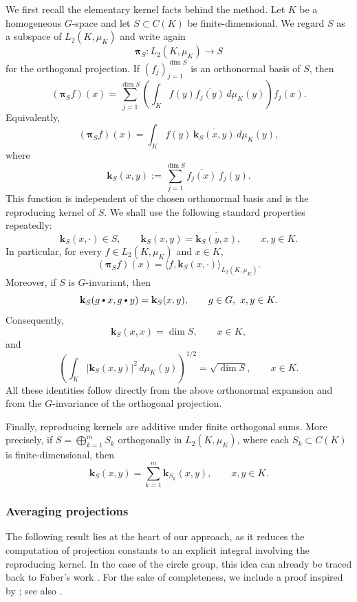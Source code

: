 \documentclass[11pt,showkeys]{amsart}
\newcommand{\hbullet}{\mathbin{\vcenter{\hbox{\scalebox{0.7}{$\bullet$}}}}}
\begin{document}
We first recall the elementary kernel facts behind the method. Let \(K\)
be a homogeneous \(G\)-space and let \(S\subset C(K)\) be
finite-dimensional. We regard \(S\) as a subspace of \(L_2(K,\mu_K)\) and
write again
\[
        \mathbf \pi_S:L_2(K,\mu_K)\longrightarrow S
\]
for the orthogonal projection. If
\((f_j)_{j=1}^{\dim S}\) is an orthonormal basis of \(S\), then
\[
        (\mathbf \pi_S f)(x)
        =
        \sum_{j=1}^{\dim S}
        \left(
        \int_K f(y)\overline{f_j(y)}\,d\mu_K(y)
        \right)f_j(x).
\]
Equivalently,
\[
        (\mathbf \pi_S f)(x)
        =
        \int_K f(y)\,
        \overline{\mathbf k_S(x,y)}\,d\mu_K(y),
\]
where
\[
        \mathbf k_S(x,y)
        :=
        \sum_{j=1}^{\dim S}
        \overline{f_j(x)}\,f_j(y).
\]
This function is independent of the chosen orthonormal basis and is the
reproducing kernel of \(S\). We shall use the following standard
properties repeatedly:
\[
        \mathbf k_S(x,\cdot)\in S,
        \qquad
        \mathbf k_S(x,y)
        =
        \overline{\mathbf k_S(y,x)},
        \qquad x,y\in K.
\]
In particular, for every \(f\in L_2(K,\mu_K)\) and \(x\in K\),
\[
        (\mathbf \pi_S f)(x)
        =
        \big\langle
        f,\mathbf k_S(x,\cdot)
        \big\rangle_{L_2(K,\mu_K)}.
\]
Moreover, if \(S\) is \(G\)-invariant, then
\[
         \mathbf k_S(g\hbullet x,g\hbullet y)
        =
         \mathbf k_S(x,y),
        \qquad
        g\in G,\ x,y\in K.
\]
Consequently,
\[
        \mathbf k_S(x,x)=\dim S,
        \qquad x\in K,
\]
and
\[
        \left(
        \int_K |\mathbf k_S(x,y)|^2\,d\mu_K(y)
        \right)^{1/2}
        =
        \sqrt{\dim S},
        \qquad x\in K.
\]
All these identities follow directly from the above orthonormal expansion
and from the \(G\)-invariance of the orthogonal projection.

Finally, reproducing kernels are additive under finite orthogonal
sums. More precisely, if
\(
    S=\bigoplus_{k=1}^m S_k
\)
orthogonally in \(L_2(K,\mu_K)\), where each \(S_k\subset C(K)\) is
finite-dimensional, then
\[
    \mathbf k_S(x,y)
    =
    \sum_{k=1}^m \mathbf k_{S_k}(x,y),
    \qquad x,y\in K.
\]





\subsubsection{Averaging projections}
The following result lies at the heart of our approach, as it reduces the computation of projection constants to an explicit integral involving the reproducing kernel. In the case of the circle group, this idea can already be traced back to Faber's work \cite{faber1914interpolatorische}. For the sake of completeness, we include a proof inspired by \cite{rudin1962projections}; see also \cite[Theorem~III.B.13]{wojtaszczyk1996banach}.
\end{document}
